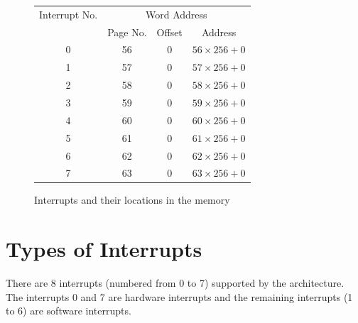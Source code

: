 	\begin{figure}[htp!]
	\centering
	\renewcommand{\arraystretch}{1.2}
	\begin{tabular}{cccc}
	\toprule
	Interrupt No. & \multicolumn{3}{c}{Word Address} \\ \cline{2-4}
	& Page No. & Offset & Address \\ \midrule
	0 & 56       & 0      & $56\times256+0$ \\
	1 & 57       & 0      & $57\times256+0$ \\
	2 & 58       & 0      & $58\times256+0$ \\
	3 & 59       & 0      & $59\times256+0$ \\
	4 & 60       & 0      & $60\times256+0$ \\
	5 & 61       & 0      & $61\times256+0$ \\
	6 & 62       & 0      & $62\times256+0$ \\
	7 & 63       & 0      & $63\times256+0$ \\
	\bottomrule
	\end{tabular}
	\caption{Interrupts and their locations in the memory}
	\label{interrupt table}
	\end{figure}


\section{Types of Interrupts}
There are 8 interrupts (numbered from 0 to 7) supported by the {\ESIM} architecture.
The interrupts 0 and 7 are hardware interrupts and the remaining interrupts (1 to 6) are software interrupts.

